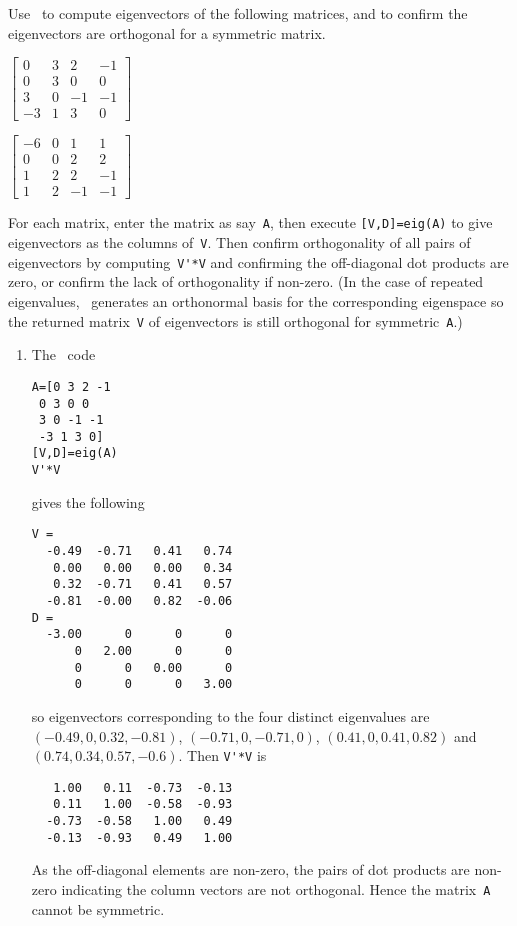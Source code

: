 \begin{example} \label{eg:4x4orthevec}
Use \script\ to compute eigenvectors of the following matrices, and to confirm the eigenvectors are orthogonal for a symmetric matrix.
\begin{parts}
\item \(\begin{bmatrix} 0 & 3 & 2 & -1
\\ 0 & 3 & 0 & 0
\\ 3 & 0 & -1 & -1
\\ -3 & 1 & 3 & 0 \end{bmatrix}\)
  
\item \(\begin{bmatrix} -6 & 0 & 1 & 1
\\ 0 & 0 & 2 & 2
\\ 1 & 2 & 2 & -1
\\ 1 & 2 & -1 & -1 \end{bmatrix}\)
\end{parts}
\begin{solution} 
For each matrix, enter the matrix as say~\verb|A|, then execute \verb|[V,D]=eig(A)| to give eigenvectors as the columns of~\verb|V|. 
Then confirm orthogonality of all pairs of eigenvectors by computing~\verb|V'*V| and confirming the off-diagonal dot products are zero, or confirm the lack of orthogonality if non-zero.
(In the case of repeated eigenvalues, \script\ generates an orthonormal basis for the corresponding eigenspace so the returned matrix~\verb|V| of eigenvectors is still orthogonal for symmetric~\verb|A|.)
\begin{enumerate}
\item The \script\ code 
\setbox\ajrqrbox\hbox{}%
\marginpar{\usebox{\ajrqrbox}}%
\begin{verbatim}
A=[0 3 2 -1
 0 3 0 0
 3 0 -1 -1
 -3 1 3 0]
[V,D]=eig(A)
V'*V
\end{verbatim}
gives the following \twodp
\begin{verbatim}
V =
  -0.49  -0.71   0.41   0.74
   0.00   0.00   0.00   0.34
   0.32  -0.71   0.41   0.57
  -0.81  -0.00   0.82  -0.06
D =
  -3.00      0      0      0
      0   2.00      0      0
      0      0   0.00      0
      0      0      0   3.00
\end{verbatim}
so eigenvectors corresponding to the four distinct eigenvalues are
\sloppy
\((-0.49,0,0.32,-0.81)\), \((-0.71,0,-0.71,0)\), \((0.41,0,0.41,0.82)\) and \((0.74,0.34,0.57,-0.6)\).
Then \verb|V'*V| is \twodp
\begin{verbatim}
   1.00   0.11  -0.73  -0.13
   0.11   1.00  -0.58  -0.93
  -0.73  -0.58   1.00   0.49
  -0.13  -0.93   0.49   1.00
\end{verbatim}
As the off-diagonal elements are non-zero,  the pairs of dot products are non-zero indicating the column vectors are not orthogonal.  
Hence the matrix~\verb|A| cannot be symmetric.


\end{enumerate}
\end{solution}
\end{example}
